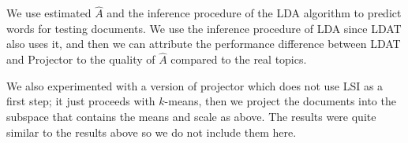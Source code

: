 We use estimated $\hat{A}$ and the inference procedure of the LDA
algorithm to predict words for testing documents. We use the inference
procedure of LDA since LDAT also uses it, and then we can attribute
the performance difference between LDAT and Projector to the quality
of $\hat{A}$ compared to the real topics.

We also experimented with a version of projector which does
not use LSI as a first step; it just proceeds
with $k$-means, then we project the documents into the subspace
that contains the means and scale as above.  The results
were quite similar to the results above so we do not
include them here. 


